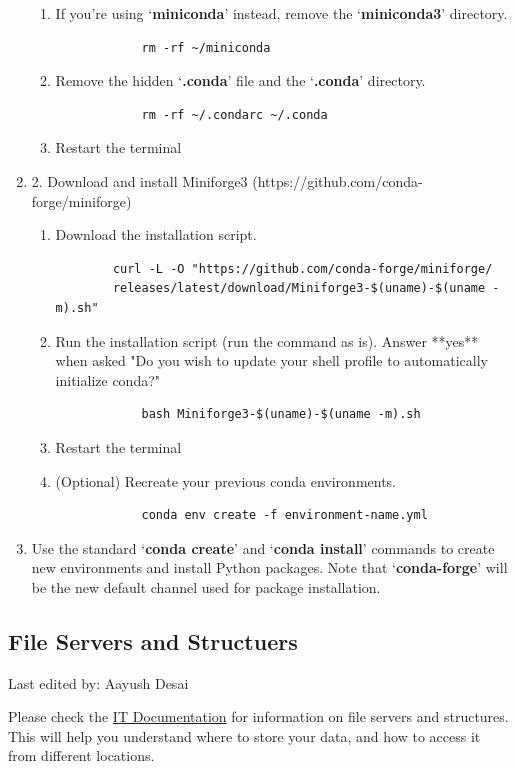 \documentclass{article}
\newcommand{\setlasteditor}[1]{\gdef\lasteditor{#1}}
\newcommand{\lastedited}{%
    \vspace{1mm} {\footnotesize Last edited by: \lasteditor} \vspace{3mm}
    \newline

}
\begin{document}
\begin{enumerate}
\begin{enumerate}
        \item If you're using `\textbf{miniconda}' instead, remove the `\textbf{miniconda3}' directory.
        \begin{verbatim}
            rm -rf ~/miniconda
        \end{verbatim}
        \item Remove the hidden `\textbf{.conda}' file and the `\textbf{.conda}' directory.
        \begin{verbatim}
            rm -rf ~/.condarc ~/.conda
        \end{verbatim}
        \item Restart the terminal
    \end{enumerate}
    \item 2. Download and install Miniforge3 (https://github.com/conda-forge/miniforge)
    \begin{enumerate}
        \item Download the installation script.
        \begin{verbatim}
        curl -L -O "https://github.com/conda-forge/miniforge/
        releases/latest/download/Miniforge3-$(uname)-$(uname -m).sh"
        \end{verbatim}
        \item Run the installation script (run the command as is). Answer **yes** when asked "Do you wish to update your shell profile to automatically initialize conda?"
        \begin{verbatim}
            bash Miniforge3-$(uname)-$(uname -m).sh
        \end{verbatim}
        \item Restart the terminal
        \item (Optional) Recreate your previous conda environments.
        \begin{verbatim}
            conda env create -f environment-name.yml
        \end{verbatim}
    \end{enumerate}
    \item Use the standard `\textbf{conda create}' and `\textbf{conda install}' commands to create new environments and install Python packages. Note that `\textbf{conda-forge}' will be the new default channel used for package installation.
\end{enumerate}

\subsection{File Servers and Structuers}
\setlasteditor{Aayush Desai}
\lastedited
\noindent
Please check the \href{https://it.pages.ist.ac.at/docs/it-documentation/file-servers/}{IT Documentation} for information on file servers and structures. This will help you understand where to store your data, and how to access it from different locations.
\end{document}
